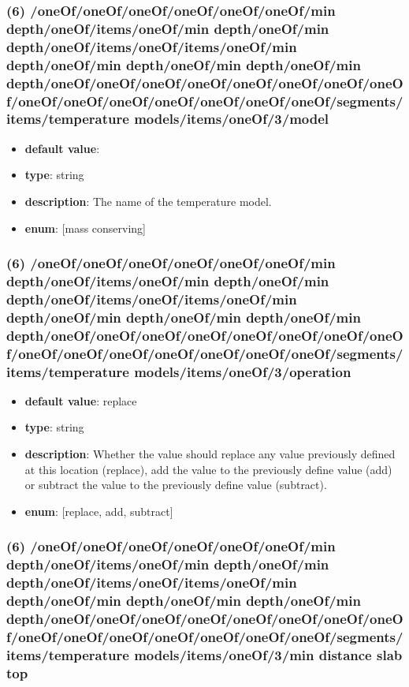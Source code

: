 \subsubsection{(6) /oneOf/oneOf/oneOf/oneOf/oneOf/oneOf/min depth/oneOf/items/oneOf/min depth/oneOf/min depth/oneOf/items/oneOf/items/oneOf/min depth/oneOf/min depth/oneOf/min depth/oneOf/min depth/oneOf/oneOf/oneOf/oneOf/oneOf/oneOf/oneOf/oneOf/oneOf/oneOf/oneOf/oneOf/oneOf/oneOf/oneOf/segments/items/temperature models/items/oneOf/3/model}
\begin{itemize}[leftmargin=6em]\item {\bf default value}: 
\item {\bf type}: string
\item {\bf description}: The name of the temperature model.
\item {\bf enum}: [mass conserving]\end{itemize}\subsubsection{(6) /oneOf/oneOf/oneOf/oneOf/oneOf/oneOf/min depth/oneOf/items/oneOf/min depth/oneOf/min depth/oneOf/items/oneOf/items/oneOf/min depth/oneOf/min depth/oneOf/min depth/oneOf/min depth/oneOf/oneOf/oneOf/oneOf/oneOf/oneOf/oneOf/oneOf/oneOf/oneOf/oneOf/oneOf/oneOf/oneOf/oneOf/segments/items/temperature models/items/oneOf/3/operation}
\begin{itemize}[leftmargin=6em]\item {\bf default value}: replace
\item {\bf type}: string
\item {\bf description}: Whether the value should replace any value previously defined at this location (replace), add the value to the previously define value (add) or subtract the value to the previously define value (subtract).
\item {\bf enum}: [replace, add, subtract]\end{itemize}\subsubsection{(6) /oneOf/oneOf/oneOf/oneOf/oneOf/oneOf/min depth/oneOf/items/oneOf/min depth/oneOf/min depth/oneOf/items/oneOf/items/oneOf/min depth/oneOf/min depth/oneOf/min depth/oneOf/min depth/oneOf/oneOf/oneOf/oneOf/oneOf/oneOf/oneOf/oneOf/oneOf/oneOf/oneOf/oneOf/oneOf/oneOf/oneOf/segments/items/temperature models/items/oneOf/3/min distance slab top}
